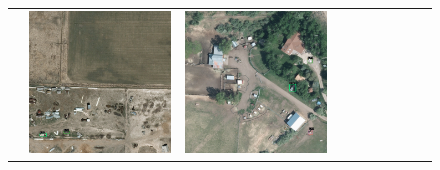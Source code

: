 \begin{figure}[h!]
\begin{tabularx}{\textwidth}{c|*{9}{X}}
    & \includegraphics[trim={360pt 200pt 540pt 715pt},clip,width=\linewidth]{images/015Results/01abb_vs_obb/comp_images/abb/212.png}
    & \includegraphics[trim={730pt 220pt 200pt 720pt},clip,width=\linewidth]{images/015Results/01abb_vs_obb/comp_images/abb/523.png}

\end{tabularx}
\end{figure}
